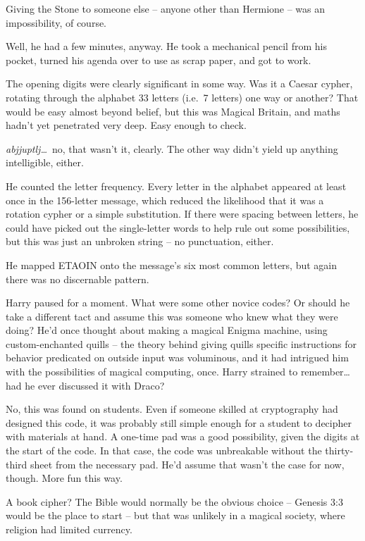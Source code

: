 Giving the Stone to someone else -- anyone other than Hermione -- was an
impossibility, of course.

Well, he had a few minutes, anyway. He took a mechanical pencil from his
pocket, turned his agenda over to use as scrap paper, and got to work.

The opening digits were clearly significant in some way. Was it a Caesar
cypher, rotating through the alphabet 33 letters (i.e.~7 letters) one
way or another? That would be easy almost beyond belief, but this was
Magical Britain, and maths hadn't yet penetrated very deep. Easy enough
to check.

\emph{abjjuptlj\ldots{}}~no, that wasn't it, clearly. The other way
didn't yield up anything intelligible, either.

He counted the letter frequency. Every letter in the alphabet appeared
at least once in the 156-letter message, which reduced the likelihood
that it was a rotation cypher or a simple substitution. If there were
spacing between letters, he could have picked out the single-letter
words to help rule out some possibilities, but this was just an unbroken
string -- no punctuation, either.

He mapped ETAOIN onto the message's six most common letters, but again
there was no discernable pattern.

Harry paused for a moment. What were some other novice codes? Or should
he take a different tact and assume this was someone who knew what they
were doing? He'd once thought about making a magical Enigma machine,
using custom-enchanted quills -- the theory behind giving quills
specific instructions for behavior predicated on outside input was
voluminous, and it had intrigued him with the possibilities of magical
computing, once. Harry strained to remember\ldots{} had he ever
discussed it with Draco?

No, this was found on students. Even if someone skilled at cryptography
had designed this code, it was probably still simple enough for a
student to decipher with materials at hand. A one-time pad was a good
possibility, given the digits at the start of the code. In that case,
the code was unbreakable without the thirty-third sheet from the
necessary pad. He'd assume that wasn't the case for now, though. More
fun this way.

A book cipher? The Bible would normally be the obvious choice -- Genesis
3:3 would be the place to start -- but that was unlikely in a magical
society, where religion had limited currency.

